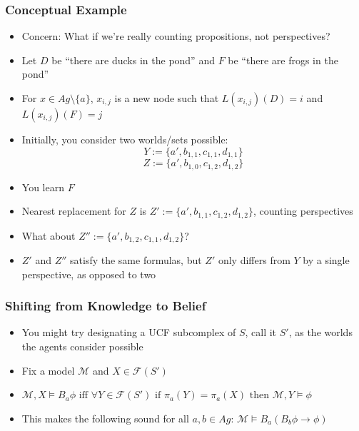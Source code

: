 \documentclass{beamer}
\newcommand{\M}{\mathcal{M}}
\newcommand{\F}{\mathcal{F}}
\begin{document}
\begin{frame}[fragile]
	\frametitle{Conceptual Example}
	\begin{itemize}
		\item Concern: What if we're really counting propositions, not perspectives?
		\item Let $D$ be ``there are ducks in the pond'' and $F$ be ``there are frogs in the pond''
		\item For $x\in Ag\setminus \{a\}$, $x_{i,j}$ is a new node such that $L(x_{i,j})(D)=i$ and $L(x_{i,j})(F)=j$
		\item Initially, you consider two worlds/sets possible:
		$$Y:=\{a',b_{1,1},c_{1,1},d_{1,1}\}$$
		$$Z:=\{a',b_{1,0},c_{1,2},d_{1,2}\}$$
		\item You learn $F$
		\item Nearest replacement for $Z$ is $Z':=\{a',b_{1,1},c_{1,2},d_{1,2}\}$, counting perspectives 
		\item What about $Z'':=\{a',b_{1,2},c_{1,1},d_{1,2}\}$?
		\item $Z'$ and $Z''$ satisfy the same formulas, but $Z'$ only differs from $Y$ by a single perspective, as opposed to two
	\end{itemize}	
\end{frame}
\begin{frame}[fragile]
	\frametitle{Shifting from Knowledge to Belief}
	
	\begin{itemize}
		
		\item You might try designating a UCF subcomplex of $S$, call it $S'$, as the worlds the agents consider possible
		\item Fix a model $\M$ and $X\in\mathcal{F}(S')$
		\item $\M,X \models B_a \phi \text{ iff } \forall Y \in \F(S') \text{ if } \pi_a(Y) = \pi_a(X) \text{ then } \M,Y \models \phi$
		\item This makes the following sound for all $a,b\in Ag$:
		$\M \models B_{a}(B_{b} \phi \rightarrow\phi)$
		
	\end{itemize}
	
\end{frame}
\end{document}
